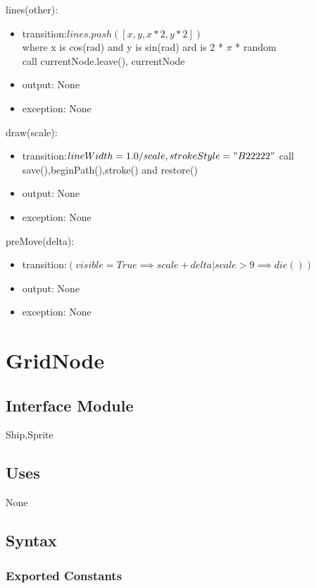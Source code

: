 \documentclass[12pt]{article}
\begin{document}
\noindent lines(other):
\begin{itemize}
\item transition:$lines.push([x,y,x*2,y*2])$\\
where x is cos(rad) and y is sin(rad) ard is 2 * $\pi$ * random\\
call currentNode.leave(), currentNode\\
\item output: None
\item exception: None
\end{itemize}

\noindent draw(scale):
\begin{itemize}
\item transition:$lineWidth = 1.0/scale, strokeStyle = "B22222"$
call save(),beginPath(),stroke() and restore()
\item output: None
\item exception: None
\end{itemize}

\noindent preMove(delta):
\begin{itemize}
\item transition:$(visible = True \implies scale + delta | scale > 9 \implies die())$
\item output: None
\item exception: None
\end{itemize}

\section* {GridNode}

\subsection*{Interface Module}

Ship,Sprite

\subsection* {Uses}

None

\subsection* {Syntax}

\subsubsection* {Exported Constants}
\end{document}
